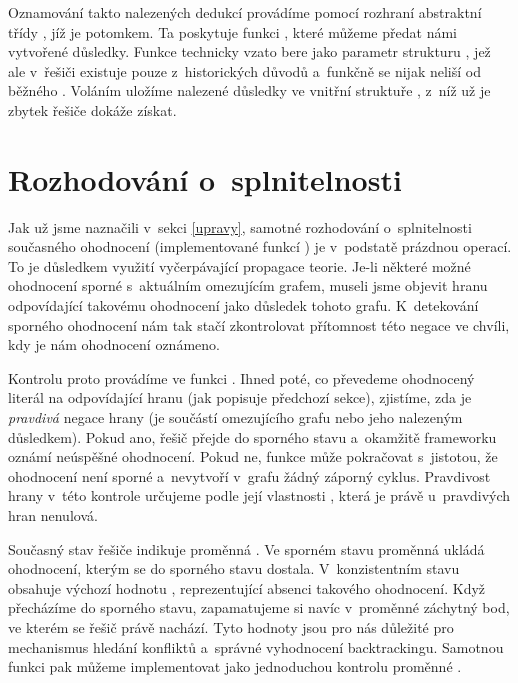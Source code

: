 Oznamování takto nalezených dedukcí provádíme pomocí rozhraní abstraktní třídy , jíž je  potomkem. Ta poskytuje funkci , které můžeme předat námi vytvořené důsledky. Funkce technicky vzato bere jako parametr strukturu , jež ale v~řešiči existuje pouze z~historických důvodů a~funkčně se nijak neliší od běžného . Voláním  uložíme nalezené důsledky ve vnitřní struktuře , z~níž už je zbytek řešiče dokáže získat.

\section{Rozhodování o~splnitelnosti}\label{rozhod}

Jak už jsme naznačili v~sekci \ref{upravy}, samotné rozhodování o~splnitelnosti současného ohodnocení (implementované funkcí ) je v~podstatě prázdnou operací. To je důsledkem využití vyčerpávající propagace teorie. Je-li některé možné ohodnocení sporné s~aktuálním omezujícím grafem, museli jsme objevit hranu odpovídající takovému ohodnocení jako důsledek tohoto grafu. K~detekování sporného ohodnocení nám tak stačí zkontrolovat přítomnost této negace ve chvíli, kdy je nám ohodnocení oznámeno.

Kontrolu proto provádíme ve funkci . Ihned poté, co převedeme ohodnocený literál na odpovídající hranu (jak popisuje předchozí sekce), zjistíme, zda je \emph{pravdivá} negace hrany (je součástí omezujícího grafu nebo jeho nalezeným důsledkem). Pokud ano, řešič přejde do sporného stavu a~okamžitě frameworku oznámí neúspěšné ohodnocení. Pokud ne, funkce může pokračovat s~jistotou, že ohodnocení není sporné a~nevytvoří v~grafu žádný záporný cyklus. Pravdivost hrany v~této kontrole určujeme podle její vlastnosti , která je právě u~pravdivých hran nenulová.

Současný stav řešiče indikuje proměnná . Ve sporném stavu proměnná ukládá ohodnocení, kterým se do sporného stavu dostala. V~konzistentním stavu obsahuje výchozí hodnotu , reprezentující absenci takového ohodnocení. Když přecházíme do sporného stavu, zapamatujeme si navíc v~proměnné  záchytný bod, ve kterém se řešič právě nachází. Tyto hodnoty jsou pro nás důležité pro mechanismus hledání konfliktů a~správné vyhodnocení backtrackingu. Samotnou funkci  pak můžeme implementovat jako jednoduchou kontrolu proměnné .

